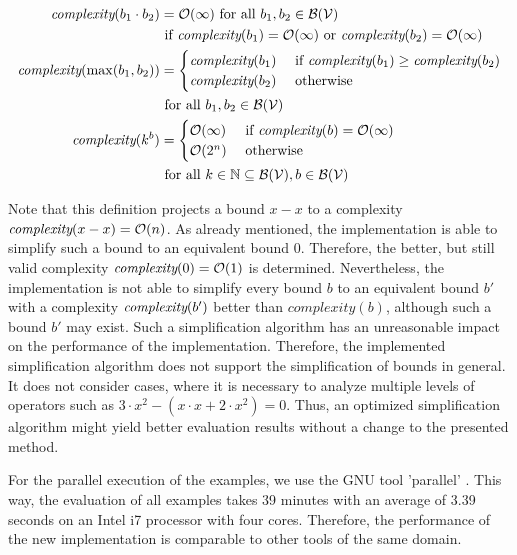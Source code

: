 \begin{definition}
\begin{align*}
    \emph{complexity}(b_1 \cdot b_2) &= \mathcal{O}(\infty) \text{ for all } b_1, b_2 \in \mathcal{B}(\mathcal{V}) \\
    & \text{ if } \emph{complexity}(b_1)=\mathcal{O}(\infty) \text{ or } \emph{complexity}(b_2)=\mathcal{O}(\infty) \\
    \emph{complexity}(\max(b_1, b_2)) &=
    \begin{cases}
      \emph{complexity}(b_1) & \text{ if } \emph{complexity}(b_1) \geq \emph{complexity}(b_2) \\
      \emph{complexity}(b_2) & \text{ otherwise }
    \end{cases} \\
    & \text{ for all } b_1, b_2 \in \mathcal{B}(\mathcal{V}) \\
    \emph{complexity}(k^b) &=
    \begin{cases}
      \mathcal{O}(\infty) & \text{ if } \emph{complexity}(b)=\mathcal{O}(\infty) \\
      \mathcal{O}(2^n) & \text{ otherwise }
    \end{cases} \\
    & \text{ for all } k \in \mathbb{N} \subseteq \mathcal{B}(\mathcal{V}), b \in \mathcal{B}(\mathcal{V}) \\
  \end{align*}
\end{definition}

Note that this definition projects a bound $x-x$ to a complexity $\emph{complexity}(x-x) = \mathcal{O}(n)$.
As already mentioned, the implementation is able to simplify such a bound to an equivalent bound $0$.
Therefore, the better, but still valid complexity $\emph{complexity}(0) = \mathcal{O}(1)$ is determined.
Nevertheless, the implementation is not able to simplify every bound $b$ to an equivalent bound $b'$ with a complexity $\emph{complexity}(b')$ better than $complexity(b)$, although such a bound $b'$ may exist.
Such a simplification algorithm has an unreasonable impact on the performance of the implementation.
Therefore, the implemented simplification algorithm does not support the simplification of bounds in general.
It does not consider cases, where it is necessary to analyze multiple levels of operators such as $3 \cdot x^2-(x \cdot x+2 \cdot x^2) = 0$.
Thus, an optimized simplification algorithm might yield better evaluation results without a change to the presented method.

For the parallel execution of the examples, we use the GNU tool 'parallel' \cite{gnuparallel}.
This way, the evaluation of all examples takes 39 minutes with an average of 3.39 seconds on an Intel i7 processor with four cores.
Therefore, the performance of the new implementation is comparable to other tools of the same domain.

